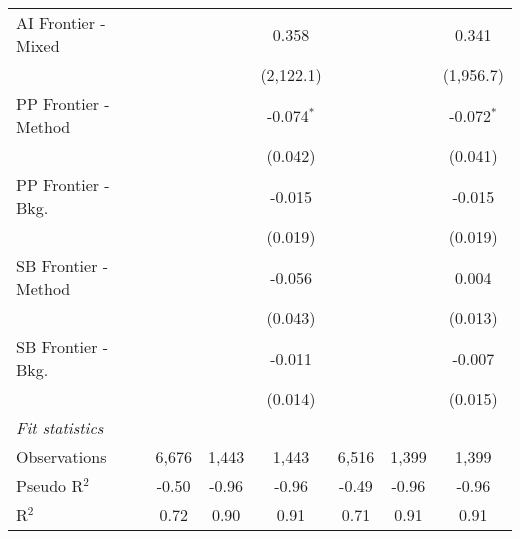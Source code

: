 \begin{tabular}{lcccccc}
   AI Frontier - Mixed  &              &         & 0.358        &              &         & 0.341\\   
                        &              &         & (2,122.1)    &              &         & (1,956.7)\\   
   PP Frontier - Method &              &         & -0.074$^{*}$ &              &         & -0.072$^{*}$\\   
                        &              &         & (0.042)      &              &         & (0.041)\\   
   PP Frontier - Bkg.   &              &         & -0.015       &              &         & -0.015\\   
                        &              &         & (0.019)      &              &         & (0.019)\\   
   SB Frontier - Method &              &         & -0.056       &              &         & 0.004\\   
                        &              &         & (0.043)      &              &         & (0.013)\\   
   SB Frontier - Bkg.   &              &         & -0.011       &              &         & -0.007\\   
                        &              &         & (0.014)      &              &         & (0.015)\\   
   \midrule
   \emph{Fit statistics}\\
   Observations         & 6,676        & 1,443   & 1,443        & 6,516        & 1,399   & 1,399\\  
   Pseudo R$^2$         & -0.50        & -0.96   & -0.96        & -0.49        & -0.96   & -0.96\\  
   R$^2$                & 0.72         & 0.90    & 0.91         & 0.71         & 0.91    & 0.91\\  
   

\end{tabular}
